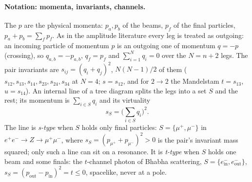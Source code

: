 \documentclass[11pt]{article}
\begin{document}
\paragraph{Notation: momenta, invariants, channels.} The $p$ are the physical momenta: $p_a,p_b$ of the beams, $p_f$ of
the final particles, $p_a+p_b=\sum_f p_f$. As in the amplitude literature every leg is treated as outgoing: an incoming
particle of momentum $p$ is an outgoing one of momentum $q=-p$ (crossing), so $q_{a,b}=-p_{a,b}$, $q_f=p_f$ and
$\sum_{i=1}^N q_i=0$ over the $N=n+2$ legs. The pair invariants are $s_{ij}=(q_i+q_j)^2$, $N(N-1)/2$ of them
($s_{12},s_{13},s_{14},s_{23},s_{24},s_{34}$ at $N=4$; $s=s_{12}$, and for $2\to2$ the Mandelstam $t=s_{13}$, $u=s_{14}$).
An internal line of a tree diagram splits the legs into a set $S$ and the rest; its momentum is $\sum_{i\in S}q_i$ and its
virtuality
\begin{equation}
  s_S=\Big(\sum_{i\in S}q_i\Big)^2 .
  \label{eq:syn-sS}
\end{equation}
The line is \emph{s-type} when $S$ holds only final particles: $S=\{\mu^+,\mu^-\}$ in $e^+e^-\to Z\to\mu^+\mu^-$, where
$s_S=(p_{\mu^+}+p_{\mu^-})^2>0$ is the pair's invariant mass squared; only such a line can sit on a resonance. It is
\emph{t-type} when $S$ holds one beam and some finals: the $t$-channel photon of Bhabha scattering,
$S=\{e^-_\text{in},e^-_\text{out}\}$, $s_S=(p_\text{out}-p_\text{in})^2=t\le0$, spacelike, never at a pole.
\end{document}

